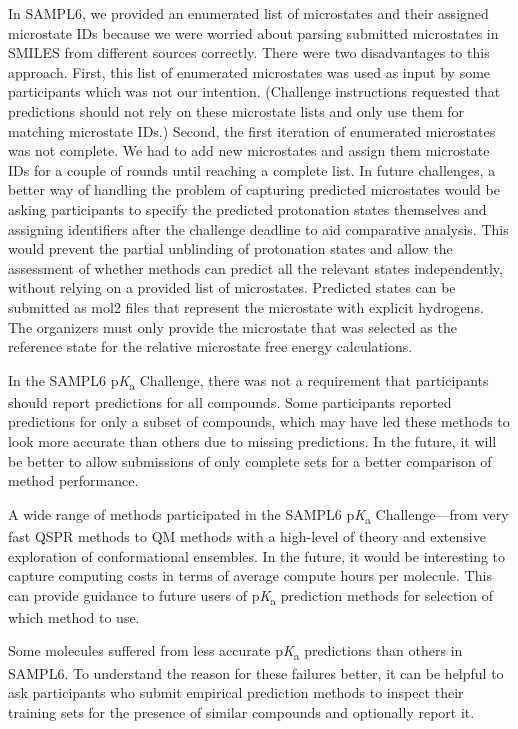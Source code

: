 \documentclass[9pt,lineno,final]{elife}
\newcommand{\pKa}{p\textit{K}\textsubscript{a}}
\begin{document}
In SAMPL6, we provided an enumerated list of microstates and their assigned microstate IDs because we were worried about parsing submitted microstates in SMILES from different sources correctly. 
There were two disadvantages to this approach. 
First, this list of enumerated microstates was used as input by some participants which was not our intention. (Challenge instructions requested that predictions should not rely on these microstate lists and only use them for matching microstate IDs.) 
Second, the first iteration of enumerated microstates was not complete. 
We had to add new microstates and assign them microstate IDs for a couple of rounds until reaching a complete list. 
In future challenges, a better way of handling the problem of capturing predicted microstates would be asking participants to specify the predicted protonation states themselves and assigning identifiers after the challenge deadline to aid comparative analysis. 
This would prevent the partial unblinding of protonation states and allow the assessment of whether methods can predict all the relevant states independently, without relying on a provided list of microstates.
Predicted states can be submitted as mol2 files that represent the microstate with explicit hydrogens. 
The organizers must only provide the microstate that was selected as the reference state for the relative microstate free energy calculations. 


In the SAMPL6 \pKa{} Challenge, there was not a requirement that participants should report predictions for all compounds. 
Some participants reported predictions for only a subset of compounds, which may have led these methods to look more accurate than others due to missing predictions.
In the future, it will be better to allow submissions of only complete sets for a better comparison of method performance. 

A wide range of methods participated in the SAMPL6 \pKa{} Challenge---from very fast QSPR methods to QM methods with a high-level of theory and extensive exploration of conformational ensembles. 
In the future, it would be interesting to capture computing costs in terms of average compute hours per molecule. 
This can provide guidance to future users of \pKa{} prediction methods for selection of which method to use.

Some molecules suffered from less accurate \pKa{} predictions than others in SAMPL6.  To understand the reason for these failures better, it can be helpful to ask participants who submit empirical prediction methods to inspect their training sets for the presence of similar compounds and optionally report it.  
\end{document}
